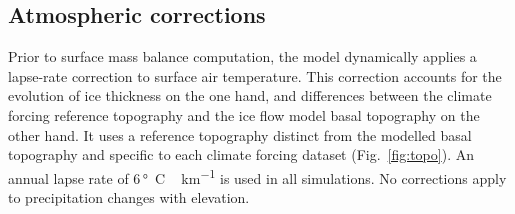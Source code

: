 
\subsection{Atmospheric corrections}

Prior to surface mass balance computation, the model dynamically applies a lapse-rate correction to surface air temperature. This correction accounts for the evolution of ice thickness on the one hand, and differences between the climate forcing reference topography and the ice flow model basal topography on the other hand. It uses a reference topography distinct from the modelled basal topography and specific to each climate forcing dataset (Fig.~\ref{fig:topo}). An annual lapse rate of 6\,\unit{\degree C\,km^{-1}} is used in all simulations. No corrections apply to precipitation changes with elevation.
